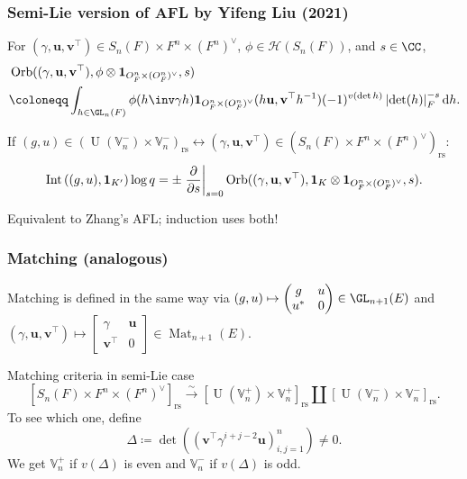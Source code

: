 \documentclass[11pt]{beamer}
\DeclareMathOperator{\Int}{Int}
\DeclareMathOperator{\Mat}{Mat}
\DeclareMathOperator{\Orb}{Orb}
\DeclareMathOperator{\U}{U}
\newcommand{\HH}{\mathcal{H}}
\newcommand{\VV}{\mathbb{V}}
\renewcommand{\OO}{O}
\newcommand{\guv}{{(\gamma, \uu, \vv^\top)}}
\newcommand{\oneV}{\mathbf{1}_{\OO_F^n \times (\OO_F^n)^\vee}}
\newcommand{\rs}{_{\text{rs}}}
\newcommand{\uu}{\mathbf{u}}
\newcommand{\vv}{\mathbf{v}}
\begin{document}
\begin{frame}
  \frametitle{Semi-Lie version of AFL by Yifeng Liu (2021)}
  \begin{definition}
  For $\guv \in S_n(F) \times F^n \times (F^n)^\vee$,
  $\phi \in \HH(S_n(F))$, and $s \in \CC$,
  \begin{align*}
    & \Orb((\gamma, \uu, \vv^\top), \phi \otimes \oneV, s) \\
    &\coloneqq \int_{h \in \GL_n(F)} \phi(h\inv \gamma h) \oneV(h \uu, \vv^\top h^{-1})
      (-1)^{v(\det h)} \left\lvert \det(h) \right\rvert_F^{-s} \odif h.
  \end{align*}
  \end{definition}

  \begin{theorem}
    If $(g, u) \in (\U(\VV_n^-) \times \VV_n^-)\rs \longleftrightarrow
      (\gamma, \uu, \vv^\top) \in (S_n(F) \times F^n \times (F^n)^\vee)\rs$:
    \[
      \Int\left( (g,u), \mathbf{1}_{K'} \right) \log q
      = \pm \left. \pdv{}{s} \right\rvert_{s=0}
      \Orb(\guv, \mathbf{1}_K \otimes \oneV, s).
    \]
  \end{theorem}
  Equivalent to Zhang's AFL; induction uses both!
\end{frame}

\begin{frame}
  \frametitle{Matching (analogous)}
  Matching is defined in the same way via
  $(g,u) \mapsto \begin{pmatrix} g & u \\ u^\ast & 0 \end{pmatrix} \in \GL_{n+1}(E)$
  and $\guv \mapsto \begin{bmatrix} \gamma & \uu \\ \vv^\top & 0 \end{bmatrix} \in \Mat_{n+1}(E)$.

  \begin{block}{Matching criteria in semi-Lie case}
  \[ [S_n(F) \times F^n \times (F^n)^\vee]\rs \xrightarrow{\sim} [\U(\VV_n^+) \times \VV_n^+]\rs \amalg [\U(\VV_n^-) \times \VV_n^-]\rs. \]
  To see which one, define
  \[ \Delta \coloneqq \det \left( \left( \vv^\top \gamma^{i+j-2} \uu \right)_{i,j=1}^n \right) \neq 0. \]
  We get $\VV_n^+$ if $v(\Delta)$ is even
  and $\VV_n^-$ if $v(\Delta)$ is odd.
  \end{block}
\end{frame}
\end{document}
